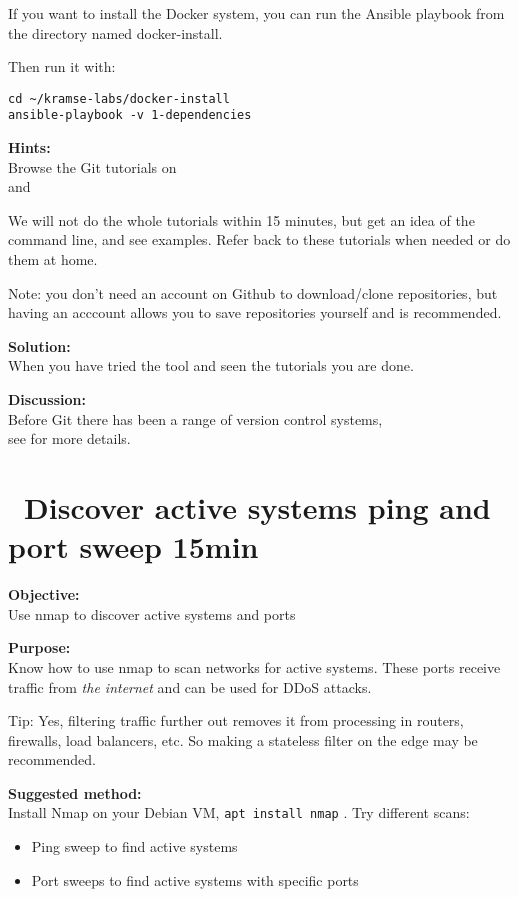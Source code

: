 \documentclass[a4paper,11pt,notitlepage]{report}
\begin{document}
If you want to install the Docker system, you can run the Ansible playbook from the directory named docker-install.

Then run it with:
\begin{verbatim}
cd ~/kramse-labs/docker-install
ansible-playbook -v 1-dependencies
\end{verbatim}



{\bf Hints:}\\
Browse the Git tutorials on \\
and 

We will not do the whole tutorials within 15 minutes, but get an idea of the command line, and see examples. Refer back to these tutorials when needed or do them at home.

Note: you don't need an account on Github to download/clone repositories, but having an acccount allows you to save repositories yourself and is recommended.

{\bf Solution:}\\
When you have tried the tool and seen the tutorials you are done.

{\bf Discussion:}\\
Before Git there has been a range of version control systems,\\
see  for more details.




\chapter{\faExclamationTriangle\ Discover active systems ping and port sweep 15min}
\label{ex:nmap-pingsweep}

{\bf Objective:}\\
Use nmap to discover active systems and ports

{\bf Purpose:}\\
Know how to use nmap to scan networks for active systems. These ports receive traffic from \emph{the internet} and can be used for DDoS attacks.

Tip: Yes, filtering traffic further out removes it from processing in routers, firewalls, load balancers, etc. So making a stateless filter on the edge may be recommended.

{\bf Suggested method:}\\
Install Nmap on your Debian VM, \verb+apt install nmap+ . Try different scans:
\begin{itemize}
\item Ping sweep to find active systems
\item Port sweeps to find active systems with specific ports
\end{itemize}
\end{document}
